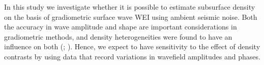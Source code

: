 \documentclass{article} %
\begin{document}
	

	



	
	In this study we investigate whether it is possible to estimate subsurface density on the basis of gradiometric surface wave WEI using ambient seismic noise. Both the accuracy in wave amplitude and shape are important considerations in gradiometric methods, and density heterogeneities were found to have an influence on both (\cite{plonka2016imprint}; \cite{blom2017synthetic}). Hence, we expect to have sensitivity to the effect of density contrasts by using data that record variations in wavefield amplitudes and phases. \\
\end{document}
